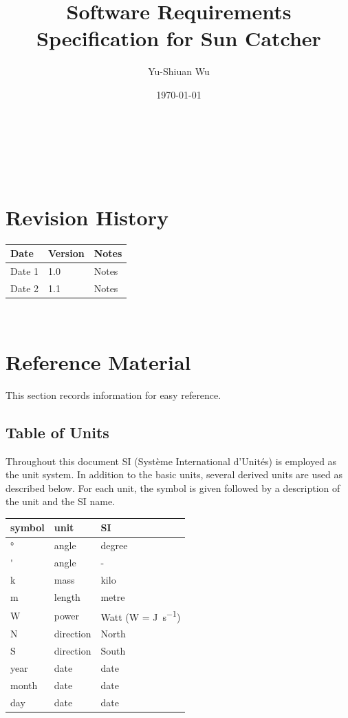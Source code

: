 \documentclass[12pt]{article}
\begin{document}
\title{Software Requirements Specification for Sun Catcher} 
\author{Yu-Shiuan Wu}
\date{\today}
	
\maketitle

~\newpage


\tableofcontents

~\newpage

\section*{Revision History}

\begin{tabularx}{\textwidth}{p{3cm}p{2cm}X}
\toprule {\bf Date} & {\bf Version} & {\bf Notes}\\
\midrule
Date 1 & 1.0 & Notes\\
Date 2 & 1.1 & Notes\\
\bottomrule
\end{tabularx}

~\newpage

\section{Reference Material}

This section records information for easy reference.

\subsection{Table of Units}

Throughout this document SI (Syst\`{e}me International d'Unit\'{e}s) is employed
as the unit system.  In addition to the basic units, several derived units are
used as described below.  For each unit, the symbol is given followed by a
description of the unit and the SI name.
~\newline

\renewcommand{\arraystretch}{1.2}
  \noindent \begin{tabular}{l l l} 
    \toprule		
    \textbf{symbol} & \textbf{unit} & \textbf{SI}\\
    \midrule 
    \si{\degree} & angle & degree\\
    \si{'} & angle	& - \\
    \si{k} & mass   & kilo\\
    \si{m} &  length   & metre \\
    \si{\watt} & power & Watt (W = \si{\joule\per\second})\\
	  N & direction & North\\
	  S & direction & South\\
	  year & date & date\\
	  month & date & date\\
	  day & date & date\\
    \bottomrule
  \end{tabular}
\end{document}
